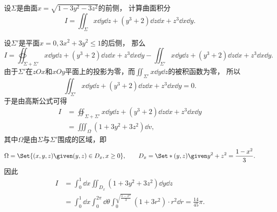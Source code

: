 \begin{example}
设\(\Sigma\)是曲面\(x = \sqrt{1-3y^2-3z^2}\)的前侧，
计算曲面积分\begin{equation*}
	I = \iint_\Sigma x \dd{y}\dd{z} + (y^3+2) \dd{z}\dd{x} + z^3 \dd{x}\dd{y}.
\end{equation*}
\begin{solution}
设\(\Sigma'\)是平面\(x=0,3x^2+3y^2\leq1\)的后侧，
那么\begin{equation*}
	I = \oiint_{\Sigma + \Sigma'} x \dd{y}\dd{z} + (y^3+2) \dd{z}\dd{x} + z^3 \dd{x}\dd{y}
	- \iint_{\Sigma'} x \dd{y}\dd{z} + (y^3+2) \dd{z}\dd{x} + z^3 \dd{x}\dd{y}.
\end{equation*}
由于\(\Sigma'\)在\(zOx\)和\(xOy\)平面上的投影为零，而\(\iint_{\Sigma'} x \dd{y}\dd{z}\)的被积函数为零，
所以\begin{equation*}
	\iint_{\Sigma'} x \dd{y}\dd{z} + (y^3+2) \dd{z}\dd{x} + z^3 \dd{x}\dd{y} = 0.
\end{equation*}
于是由高斯公式可得\begin{align*}
	I &= \oiint_{\Sigma + \Sigma'} x \dd{y}\dd{z} + (y^3+2) \dd{z}\dd{x} + z^3 \dd{x}\dd{y} \\
	&= \iiint_\Omega (1+3y^2+3z^2) \dd{v},
\end{align*}
其中\(\Omega\)是由\(\Sigma\)与\(\Sigma'\)围成的区域，即\begin{equation*}
	\Omega = \Set{ (x,y,z) \given (y,z) \in D_x, x\geq0 },
	\qquad
	D_x = \Set*{ (y,z) \given y^2+z^2 = \frac{1-x^2}3 }.
\end{equation*}
因此\begin{align*}
	I &= \int_0^1 \dd{x} \iint_{D_x} (1+3y^2+3z^2) \dd{y}\dd{z} \\
	&= \int_0^1 \dd{x}
	\int_0^{2\pi} \dd{\theta}
	\int_0^{\sqrt{\frac{1-x^2}3}} (1+3r^2) \cdot r^2 \dd{r}
	= \frac{14}{45} \pi.
\end{align*}
\end{solution}
\end{example}
